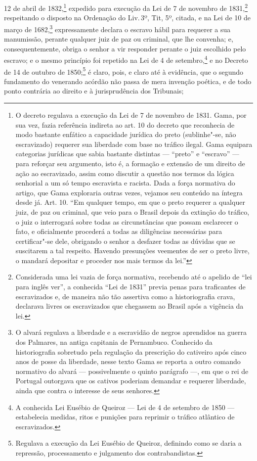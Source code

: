12 de abril de 1832,\footnote{O decreto regulava a execução da Lei de 7
  de novembro de 1831. Gama, por sua vez, fazia referência indireta ao
  art. 10 do decreto que reconhecia de modo bastante enfático a
  capacidade jurídica do preto (sublinhe"-se, não escravizado) requerer
  sua liberdade com base no tráfico ilegal. Gama equipara categorias
  jurídicas que sabia bastante distintas --- ``preto'' e ``escravo'' --- para
  reforçar seu argumento, isto é, a formação e extensão de um direito de
  ação ao escravizado, assim como discutir a questão nos termos da
  lógica senhorial a um só tempo escravista e racista. Dada a força
  normativa do artigo, que Gama exploraria outras vezes, vejamos seu conteúdo na
  íntegra desde já. Art. 10. ``Em qualquer tempo, em que o preto requerer
  a qualquer juiz, de paz ou criminal, que veio para o Brasil depois da
  extinção do tráfico, o juiz o interrogará sobre todas as
  circunstâncias que possam esclarecer o fato, e oficialmente procederá
  a todas as diligências necessárias para certificar"-se dele, obrigando
  o senhor a desfazer todas as dúvidas que se suscitarem a tal respeito.
  Havendo presunções veementes de ser o preto livre, o mandará depositar
  e proceder nos mais termos da lei.''} expedido para execução da Lei de
7 de novembro de 1831,\footnote{Considerada uma lei vazia de força
  normativa, recebendo até o apelido de ``lei para inglês ver'', a
  conhecida ``Lei de 1831'' previa penas para traficantes de escravizados
  e, de maneira não tão assertiva como a historiografia crava, declarava
  livres os escravizados que chegassem ao Brasil após a vigência da lei.}
respeitando o disposto na Ordenação do Liv.\,3º, Tit, 5º, citada, e na
Lei de 10 de março de 1682,\footnote{O alvará regulava a liberdade e a
  escravidão de negros aprendidos na guerra dos Palmares, na antiga
  capitania de Pernambuco. Conhecido da historiografia sobretudo pela
  regulação da prescrição do cativeiro após cinco anos de posse da
  liberdade, nesse texto Gama se reporta a outro comando normativo do
  alvará --- possivelmente o quinto parágrafo ---, em que o rei de Portugal
  outorgava que os cativos poderiam demandar e requerer liberdade, ainda
  que contra o interesse de seus senhores.} expressamente declara o escravo
hábil para requerer a sua manumissão, perante qualquer juiz de paz ou
criminal, que lhe convenha; e, consequentemente, obriga o senhor a vir
responder perante o juiz escolhido pelo escravo; e o mesmo princípio foi
repetido na Lei de 4 de setembro,\footnote{A conhecida Lei Eusébio de
  Queiroz --- Lei de 4 de setembro de 1850 --- estabelecia medidas, ritos e
  punições para reprimir o tráfico atlântico de escravizados.} e no
Decreto de 14 de outubro de 1850;\footnote{Regulava a execução da Lei
  Eusébio de Queiroz, definindo como se daria a repressão, processamento
  e julgamento dos contrabandistas.} é claro, pois, e claro até à
evidência, que o segundo fundamento do venerando acórdão não passa de
mera invenção poética, e de todo ponto contrária ao direito e à
jurisprudência dos Tribunais;

